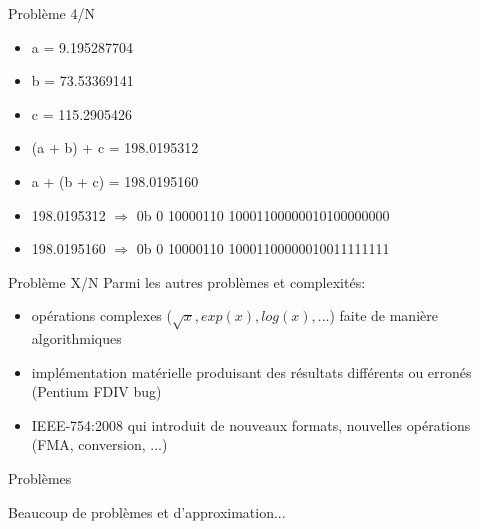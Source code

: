 \documentclass{beamer}
\begin{document}
    \begin{frame}{Problème 4/N} 
    \begin{itemize}
\item a = 9.195287704 \\
\item b = 73.53369141 \\
\item c = 115.2905426 \\
\item (a + b) + c = 198.0195312 \\
\item a + (b + c) = 198.0195160 \\
\item 198.0195312 $\Rightarrow$ 0b \textcolor{SignColor}{0} \textcolor{ExponentColor}{10000110} \textcolor{FractionColor}{10001100000010100000000}\\
\item 198.0195160 $\Rightarrow$ 0b \textcolor{SignColor}{0} \textcolor{ExponentColor}{10000110} \textcolor{FractionColor}{10001100000010011111111}
\end{itemize}
    \end{frame}
    
  \begin{frame}{Problème X/N}
  Parmi les autres problèmes et complexités: 
  \begin{itemize}
  \item opérations complexes ($\sqrt{x}, exp(x), log(x), ...$) faite de manière algorithmiques
  \item implémentation matérielle produisant des résultats différents ou erronés (Pentium FDIV bug)
  \item IEEE-754:2008 qui introduit de nouveaux formats, nouvelles opérations (FMA, conversion, ...)
  \end{itemize}
  \end{frame}
  
    \begin{frame}{Problèmes}
    \begin{center}
    Beaucoup de problèmes et d'approximation...
      \end{center}
        \end{frame}  
  
  
\end{document}
